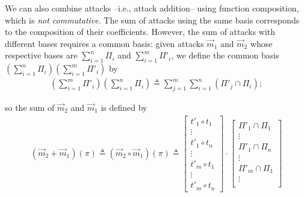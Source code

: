 {\begin{definition}[Attack]
We can also combine attacks --i.e., attack addition-- using function composition, which is \emph{not commutative}. The sum of attacks using the same basis corresponds to the composition of their coefficients. However, the sum of attacks with different bases requires a common basis: given attacks $\vec{m}_1$ and $\vec{m}_2$ whose respective bases are $\sum_{i=1}^n\Pi_i$ and $\sum_{i=1}^m\Pi'_i$, 
we define the common basis $(\sum_{i=1}^n\Pi_i)(\sum_{i=1}^m\Pi'_i)$ by 
\begin{align}
  \left(\sum_{i=1}^m\Pi'_i\right)\left(\sum_{i=1}^n\Pi_i\right)\triangleq \sum_{j=1}^m\sum_{i=1}^n(\Pi'_j\cap\Pi_i);
\end{align}

so the sum of $\vec{m}_2$ and $\vec{m}_1$ is defined by
\begin{align}
  (\vec{m}_2+\vec{m}_1)(\pi)\triangleq(\vec{m}_2\circ\vec{m}_1)(\pi)\triangleq
  \begin{bmatrix}
    t'_{1}\circ t_1 \\
    \vdots \\
    t'_{1}\circ t_n\\
    \vdots \\
    t'_{m}\circ t_1 \\
    \vdots \\
    t'_{m}\circ t_n
  \end{bmatrix}
  \cdot
  \begin{bmatrix}
    \Pi'_{1}\cap\Pi_{1} \\
    \vdots \\
    \Pi'_{1}\cap\Pi_{n}\\
    \vdots \\
    \Pi'_{m}\cap\Pi_{1} \\
    \vdots \\

\end{bmatrix}
\end{align}
\end{definition}}
